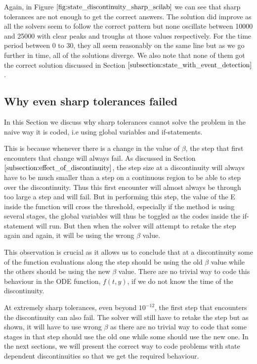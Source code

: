 Again, in Figure $\ref{fig:state_discontinuity_sharp_scilab}$ we can see that sharp tolerances are not enough to get the correct answers. The solution did improve as all the solvers seem to follow the correct pattern but none oscillate between 10000 and 25000 with clear peaks and troughs at those values respectively. For the time period between 0 to 30, they all seem reasonably on the same line but as we go further in time, all of the solutions diverge. We also note that none of them got the correct solution discussed in Section $\ref{subsection:state_with_event_detection}$.

\subsection{Why even sharp tolerances failed}
\label{subsection:state_sharp_tol_failed}
In this Section we discuss why sharp tolerances cannot solve the problem in the naive way it is coded, i.e using global variables and if-statements. 

This is because whenever there is a change in the value of $\beta$, the step that first encounters that change will always fail. As discussed in Section $\ref{subsection:effect_of_discontinuity}$, the step size at a discontinuity will always have to be much smaller than a step on a continuous region to be able to step over the discontinuity. Thus this first encounter will almost always be through too large a step and will fail. But in performing this step,  the value of the E inside the function will cross the threshold, especially if the method is using several stages, the global variables will thus be toggled as the codes inside the if-statement will run. But then when the solver will attempt to retake the step again and again, it will be using the wrong $\beta$ value. 

This observation is crucial as it allows us to conclude that at a discontinuity some of the function evaluations along the step should be using the old $\beta$ value while the others should be using the new $\beta$ value. There are no trivial way to code this behaviour in the ODE function, $f(t, y)$, if we do not know the time of the discontinuity.

At extremely sharp tolerances, even beyond $10^{-12}$, the first step that encounters the discontinuity can also fail. The solver will still have to retake the step but as shown, it will have to use wrong $\beta$ as there are no trivial way to code that some stages in that step should use the old one while some should use the new one. In the next sections, we will present the correct way to code problems with state dependent discontinuities so that we get the required behaviour.

